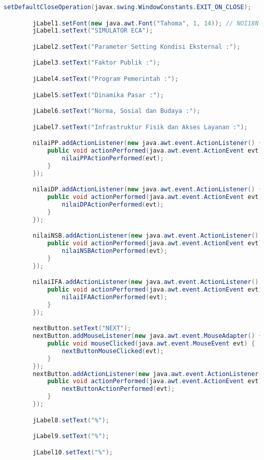 \begin{lstlisting}[language=Java, caption=TampilanKondisiEksternal.java]
        setDefaultCloseOperation(javax.swing.WindowConstants.EXIT_ON_CLOSE);

        jLabel1.setFont(new java.awt.Font("Tahoma", 1, 14)); // NOI18N
        jLabel1.setText("SIMULATOR ECA");

        jLabel2.setText("Parameter Setting Kondisi Eksternal :");

        jLabel3.setText("Faktor Publik :");

        jLabel4.setText("Program Pemerintah :");

        jLabel5.setText("Dinamika Pasar :");

        jLabel6.setText("Norma, Sosial dan Budaya :");

        jLabel7.setText("Infrastruktur Fisik dan Akses Layanan :");

        nilaiPP.addActionListener(new java.awt.event.ActionListener() {
            public void actionPerformed(java.awt.event.ActionEvent evt) {
                nilaiPPActionPerformed(evt);
            }
        });

        nilaiDP.addActionListener(new java.awt.event.ActionListener() {
            public void actionPerformed(java.awt.event.ActionEvent evt) {
                nilaiDPActionPerformed(evt);
            }
        });

        nilaiNSB.addActionListener(new java.awt.event.ActionListener() {
            public void actionPerformed(java.awt.event.ActionEvent evt) {
                nilaiNSBActionPerformed(evt);
            }
        });

        nilaiIFA.addActionListener(new java.awt.event.ActionListener() {
            public void actionPerformed(java.awt.event.ActionEvent evt) {
                nilaiIFAActionPerformed(evt);
            }
        });

        nextButton.setText("NEXT");
        nextButton.addMouseListener(new java.awt.event.MouseAdapter() {
            public void mouseClicked(java.awt.event.MouseEvent evt) {
                nextButtonMouseClicked(evt);
            }
        });
        nextButton.addActionListener(new java.awt.event.ActionListener() {
            public void actionPerformed(java.awt.event.ActionEvent evt) {
                nextButtonActionPerformed(evt);
            }
        });

        jLabel8.setText("%");

        jLabel9.setText("%");

        jLabel10.setText("%");


\end{lstlisting}
